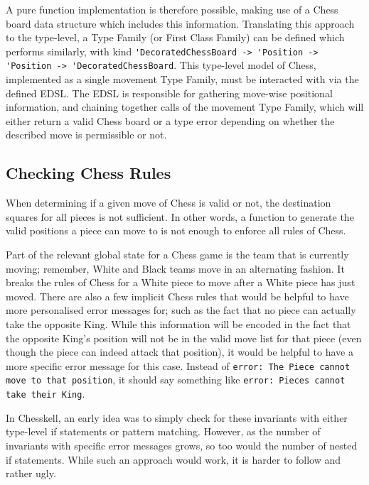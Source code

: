 \documentclass[12pt, a4paper, bibliography=totocnumbered]{scrreprt}
\newcommand{\inline}[1]{\lstinline[basicstyle=\ttfamily\footnotesize]{#1}}
\begin{document}
A pure function implementation is therefore possible, making use of a Chess board data structure which includes this information. Translating this approach to the type-level, a Type Family (or First Class Family) can be defined which performs similarly, with kind \inline{'DecoratedChessBoard -> 'Position -> 'Position -> 'DecoratedChessBoard}. This type-level model of Chess, implemented as a single movement Type Family, must be interacted with via the defined EDSL. The EDSL is responsible for gathering move-wise positional information, and chaining together calls of the movement Type Family, which will either return a valid Chess board or a type error depending on whether the described move is permissible or not.

\subsection{Checking Chess Rules} \label{chessrules}

When determining if a given move of Chess is valid or not, the destination squares for all pieces is not sufficient. In other words, a function to generate the valid positions a piece can move to is not enough to enforce all rules of Chess.

Part of the relevant global state for a Chess game is the team that is currently moving; remember, White and Black teams move in an alternating fashion. It breaks the rules of Chess for a White piece to move after a White piece has just moved. There are also a few implicit Chess rules that would be helpful to have more personalised error messages for; such as the fact that no piece can actually take the opposite King. While this information will be encoded in the fact that the opposite King's position will not be in the valid move list for that piece (even though the piece can indeed attack that position), it would be helpful to have a more specific error message for this case. Instead of \inline{error: The Piece cannot move to that position}, it should say something like \inline{error: Pieces cannot take their King}.

In Chesskell, an early idea was to simply check for these invariants with either type-level if statements or pattern matching. However, as the number of invariants with specific error messages grows, so too would the number of nested if statements. While such an approach would work, it is harder to follow and rather ugly.
\end{document}
